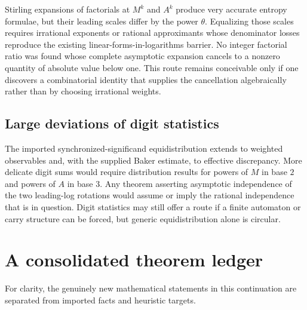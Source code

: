 \documentclass[11pt,oneside]{article}
\theoremstyle{definition}
\theoremstyle{remark}
\begin{document}
Stirling expansions of factorials at $M^k$ and $A^k$ produce very accurate entropy formulae, but their leading scales differ by the power $\theta$.  Equalizing those scales requires irrational exponents or rational approximants whose denominator losses reproduce the existing linear-forms-in-logarithms barrier.  No integer factorial ratio was found whose complete asymptotic expansion cancels to a nonzero quantity of absolute value below one.  This route remains conceivable only if one discovers a combinatorial identity that supplies the cancellation algebraically rather than by choosing irrational weights.

\subsection{Large deviations of digit statistics}

The imported synchronized-significand equidistribution extends to weighted observables and, with the supplied Baker estimate, to effective discrepancy.  More delicate digit sums would require distribution results for powers of $M$ in base $2$ and powers of $A$ in base $3$.  Any theorem asserting asymptotic independence of the two leading-log rotations would assume or imply the rational independence that is in question.  Digit statistics may still offer a route if a finite automaton or carry structure can be forced, but generic equidistribution alone is circular.

\section{A consolidated theorem ledger}
\label{sec:ledger}

For clarity, the genuinely new mathematical statements in this continuation are separated from imported facts and heuristic targets.
\end{document}
